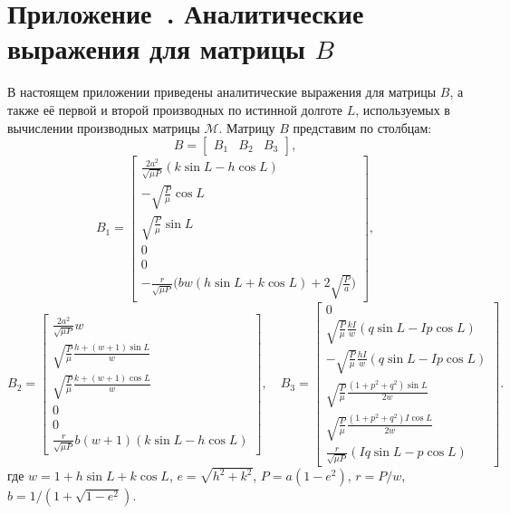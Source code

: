 \section*{Приложение~\thesection. Аналитические выражения для матрицы $B$}

В настоящем приложении приведены аналитические выражения для матрицы $B$, а также её первой и второй производных по истинной долготе $L$, используемых в вычислении производных матрицы $\mathcal{M}$. Матрицу $B$ представим по столбцам: 
\begin{equation*}
    B = 
    \begin{bmatrix}
        B_1 & B_2 & B_3
    \end{bmatrix},
\end{equation*}
\begin{equation*}
    B_1 = 
    \begin{bmatrix}
        \frac{2a^{2}}{\sqrt{\mu P}}(k\sin L-h\cos L) \\
        -\sqrt{\frac{P}{\mu}}\cos L \\
        \sqrt{\frac{P}{\mu}}\sin L \\
        0 \\
        0 \\
        -\frac{r}{\sqrt{\mu P}}\bigl(bw(h\sin L+k\cos L)+2\sqrt{\frac{P}{a}}\bigr)
    \end{bmatrix},
\end{equation*}
\begin{equation*}
    B_2 = 
    \begin{bmatrix}
        \frac{2a^{2}}{\sqrt{\mu P}}w \\
        \sqrt{\frac{P}{\mu}}\frac{h+(w+1)\sin L}{w} \\
        \sqrt{\frac{P}{\mu}}\frac{k+(w+1)\cos L}{w} \\
        0 \\
        0 \\
        \frac{r}{\sqrt{\mu P}}b(w+1)(k\sin L-h\cos L)
    \end{bmatrix},
    \quad
    B_3 = 
    \begin{bmatrix}
        0 \\
        \sqrt{\frac{P}{\mu}}\frac{kI}{w}(q\sin L-Ip\cos L) \\
        -\sqrt{\frac{P}{\mu}}\frac{hI}{w}(q\sin L-Ip\cos L) \\
        \sqrt{\frac{P}{\mu}}\frac{(1+p^{2}+q^{2})\sin L}{2w} \\
        \sqrt{\frac{P}{\mu}}\frac{(1+p^{2}+q^{2})I\cos L}{2w} \\
        \frac{r}{\sqrt{\mu P}}(Iq\sin L-p\cos L)
    \end{bmatrix}.
\end{equation*}
где $w = 1 + h \sin L + k \cos L$, $e = \sqrt{h^2 + k^2}$, $P = a(1-e^2)$, $r = P / w$, $b = 1 / \left(1+\sqrt{1-e^2} \right)$.

